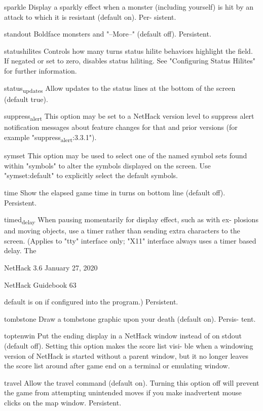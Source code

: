 \documentclass[11pt]{article}
\begin{document}
sparkle
 Display a sparkly effect when a monster (including yourself) is
 hit by an attack to which it is resistant (default on). Per-
 sistent.

standout
 Boldface monsters and "--More--" (default off). Persistent.

statushilites
 Controls how many turns status hilite behaviors highlight the
 field.  If negated or set to zero, disables status hiliting.
 See "Configuring Status Hilites" for further information.

status\textsubscript{updates}
 Allow updates to the status lines at the bottom of the screen
 (default true).

suppress\textsubscript{alert}
 This option may be set to a NetHack version level to suppress
 alert notification messages about feature changes for that and
 prior versions (for example "suppress\textsubscript{alert}:3.3.1").

symset
 This option may be used to select one of the named symbol sets
 found within "symbols" to alter the symbols displayed on the
 screen.  Use "symset:default" to explicitly select the default
 symbols.

time
 Show the elapsed game time in turns on bottom line (default
 off). Persistent.

timed\textsubscript{delay}
 When pausing momentarily for display effect, such as with ex-
 plosions and moving objects, use a timer rather than sending
 extra characters to the screen. (Applies to "tty" interface
 only; "X11" interface always uses a timer based delay.  The


NetHack 3.6                   January 27, 2020





NetHack Guidebook                       63



default is on if configured into the program.) Persistent.

tombstone
 Draw a tombstone graphic upon your death (default on). Persis-
 tent.

toptenwin
 Put the ending display in a NetHack window instead of on stdout
 (default off). Setting this option makes the score list visi-
 ble when a windowing version of NetHack is started without a
 parent window, but it no longer leaves the score list around
 after game end on a terminal or emulating window.

travel
 Allow the travel command (default on). Turning this option off
 will prevent the game from attempting unintended moves if you
 make inadvertent mouse clicks on the map window. Persistent.
\end{document}
